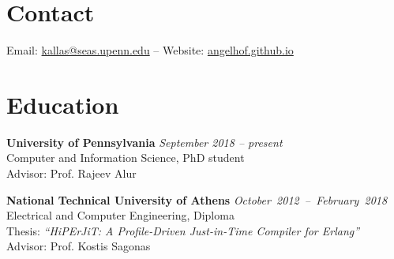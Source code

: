 \documentclass[margin]{res}
\begin{document}
\begin{resume}

\section{Contact} 
Email: \href{mailto:kallas@seas.upenn.edu}{kallas@seas.upenn.edu} -- Website: \href{https://angelhof.github.io/}{angelhof.github.io}


\section{Education}
\textbf{University of Pennsylvania} \hfill {\em September 2018 -- present}\\
Computer and Information Science, PhD student \\
Advisor: Prof. Rajeev Alur


\textbf{National Technical University of Athens} \hfill \mbox{\em October 2012 -- February 2018}\\
Electrical and Computer Engineering, Diploma \\ %
Thesis: \textit{``HiPErJiT: A Profile-Driven Just-in-Time Compiler for Erlang''} \\
Advisor: Prof. Kostis Sagonas 



\end{resume}
\end{document}
